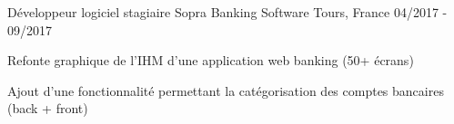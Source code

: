 \begin{cventries}
  \cventry
  {Développeur logiciel stagiaire} %
  {Sopra Banking Software} %
  {Tours, France} %
  {04/2017 - 09/2017} %
  {
    \begin{cvitems} %
      \item {Refonte graphique de l'IHM d'une application web banking (50+ écrans)}
      \item {Ajout d'une fonctionnalité permettant la catégorisation des comptes bancaires (back + front)}
    \end{cvitems}
  }

\end{cventries}

